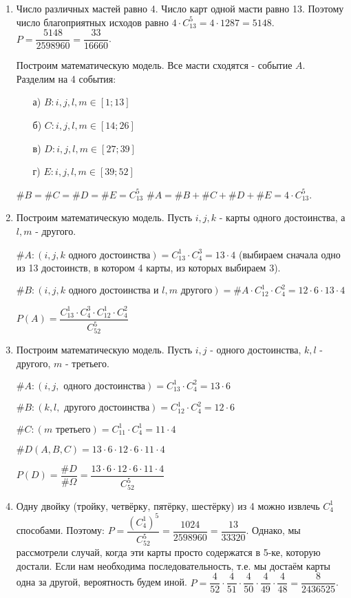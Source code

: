 \begin{enumerate}
	\item Число различных мастей равно 4. Число карт одной масти равно 13. Поэтому число благоприятных исходов равно $4 \cdot C_{13}^5 = 4 \cdot 1287 = 5148$. $P = \dfrac{5148}{2598960} = \dfrac{33}{16660}$.
	
	Построим математическую модель. Все масти сходятся - событие $A$. Разделим на 4 события:
	\begin{itemize}
		\item[а)] $B: i, j, l, m \in [1;13]$
		\item[б)] $C: i, j, l, m \in [14;26]$
		\item[в)] $D: i, j, l, m \in [27;39]$
		\item[г)] $E: i, j, l, m \in [39;52]$
	\end{itemize}
	\noindent $\#B = \#C = \#D = \#E = C_{13}^5$
	\noindent $\#A = \#B + \#C + \#D + \#E = 4 \cdot C_{13}^5$.
	\item Построим математическую модель. Пусть $i,j,k$ - карты одного достоинства, а $l,m$ - другого.
	
	\noindent $\#A: (i,j,k \text{ одного достоинства}) = C_{13}^1 \cdot C_4^3 = 13 \cdot 4$ (выбираем сначала одно из 13 достоинств, в котором 4 карты, из которых выбираем 3).
	
	\noindent $\#B: (i,j,k \text{ одного достоинства и } l,m \text{ другого}) = \#A \cdot C_{12}^1 \cdot C_4^2 = 12 \cdot 6 \cdot 13 \cdot 4$
	
	\noindent $P(A) = \dfrac{C_{13}^1 \cdot C_4^3 \cdot C_{12}^1 \cdot C_4^2}{C_{52}^5}$
	\item Построим математическую модель. Пусть $i, j$ - одного достоинства, $k, l$ - другого, $m$ - третьего.
	
	\noindent $\#A: (i, j, \text{ одного достоинства}) = C_{13}^1 \cdot C_4^2 = 13 \cdot 6$
	
	\noindent $\#B: (k, l, \text{ другого достоинства}) = C_{12}^1 \cdot C_4^2 = 12 \cdot 6$
	
	\noindent $\#C: (m \text{ третьего}) = C_{11}^1 \cdot C_4^1 = 11 \cdot 4$
	
	\noindent $\#D(A, B, C) = 13 \cdot 6 \cdot 12 \cdot 6 \cdot 11 \cdot 4$
	
	\noindent $P(D) = \dfrac{\#D}{\# \Omega} = \dfrac{13 \cdot 6 \cdot 12 \cdot 6 \cdot 11 \cdot 4}{C_{52}^5}$
	\item Одну двойку (тройку, четвёрку, пятёрку, шестёрку) из 4 можно извлечь $ C_{4}^1$ способами. Поэтому: $P = \dfrac{\left(C_{4}^1\right)^5}{C_{52}^5} = \dfrac{1024}{2598960} = \dfrac{13}{33320}$. Однако, мы рассмотрели случай, когда эти карты просто содержатся в 5-ке, которую достали. Если нам необходима последовательность, т.е. мы достаём карты одна за другой, вероятность будем иной. $P = \dfrac{4}{52} \cdot \dfrac{4}{51} \cdot \dfrac{4}{50} \cdot \dfrac{4}{49} \cdot \dfrac{4}{48} = \dfrac{8}{2436525}$.
	

\end{enumerate}
